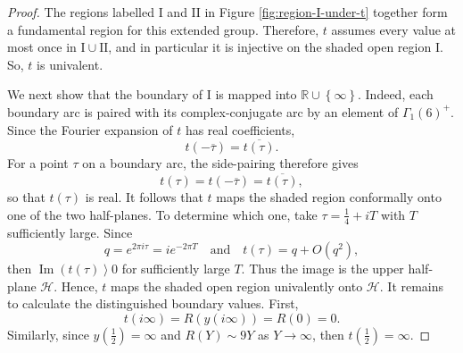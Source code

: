 \documentclass[12pt, a4paper]{amsart}
\theoremstyle{definition}
\numberwithin{theorem}{section}
\begin{document}
\begin{proof}
The regions labelled \(\mathrm{I}\) and \(\mathrm{II}\) in Figure \ref{fig:region-I-under-t} together form a fundamental region for this extended group. Therefore, \(t\) assumes every value at most once in \(\mathrm{I}\cup\mathrm{II}\), and in particular it is injective on the shaded open region \(\mathrm{I}\). So, $t$ is univalent.

We next show that the boundary of \(\mathrm{I}\) is mapped into \(\mathbb{R}\cup\left\{\infty\right\}\). Indeed, each boundary arc is paired with its complex-conjugate arc by an element of \(\Gamma_1\left(6\right)^{+}\). Since the Fourier expansion of \(t\) has real
coefficients,
\[t\left(-\overline{\tau}\right)=\overline{t\left(\tau\right)}.\]
For a point \(\tau\) on a boundary arc, the side-pairing therefore gives
\[t\left(\tau\right)=t\left(-\overline{\tau}\right)=\overline{t\left(\tau\right)},\]
so that \(t\left(\tau\right)\) is real. It follows that \(t\) maps the shaded region conformally onto one of the two
half-planes. To determine which one, take $\tau=\frac{1}{4}+iT$ with \(T\) sufficiently large. Since
\[q=e^{2\pi i\tau}=ie^{-2\pi T}\quad\text{and}\quad t\left(\tau\right)=q+O\left(q^2\right),\]
then $\operatorname{Im}\left(t\left(\tau\right)\right>0$ for sufficiently large \(T\). Thus the image is the upper half-plane \(\mathcal{H}\). Hence, \(t\) maps the shaded open region univalently onto \(\mathcal{H}\). It remains to calculate the distinguished boundary values. First,
\[t\left(i\infty\right)=R\left(y\left(i\infty\right)\right)=R\left(0\right)=0.\]
Similarly, since \(y\left(\frac{1}{2}\right)=\infty\) and $R\left(Y\right)\sim 9Y$ as $Y\to\infty$, then $t\left(\frac{1}{2}\right)=\infty$. 


\end{proof}
\end{document}

